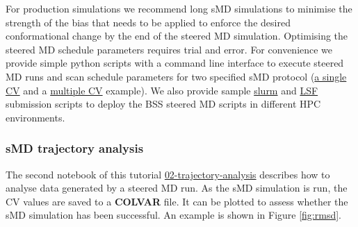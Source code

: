 For production simulations we recommend long sMD simulations to minimise the strength of the bias that needs to be applied to enforce the desired conformational change by the end of the steered MD simulation. Optimising the steered MD schedule parameters requires trial and error. 
For convenience we provide simple python scripts with a command line interface to execute steered MD runs and scan schedule parameters for two specified sMD protocol (\href{https://github.com/OpenBioSim/BioSimSpaceTutorials/blob/main/03_steered_md/scripts/sMD_simple.py}{a single CV} and a \href{https://github.com/OpenBioSim/BioSimSpaceTutorials/blob/main/03_steered_md/scripts/sMD_multiCV.py}{multiple CV} example). We also provide sample \href{https://github.com/OpenBioSim/BioSimSpaceTutorials/blob/main/03_steered_md/scripts/sMD_slurm.sh}{slurm} and \href{https://github.com/OpenBioSim/BioSimSpaceTutorials/blob/main/03_steered_md/scripts/sMD_LSF.sh}{LSF} submission scripts to deploy the BSS steered MD scripts in different HPC environments. 

\subsubsection{sMD trajectory analysis}

The second notebook of this tutorial \href{https://github.com/OpenBioSim/BioSimSpaceTutorials/blob/main/03_steered_md/02_trajectory_analysis.ipynb}{02-trajectory-analysis} describes how to analyse data generated by a steered MD run. As the sMD simulation is run, the CV values are saved to a \textbf{COLVAR} file. It can be plotted to assess whether the sMD simulation has been successful. An example is shown in Figure \ref{fig:rmsd}.

